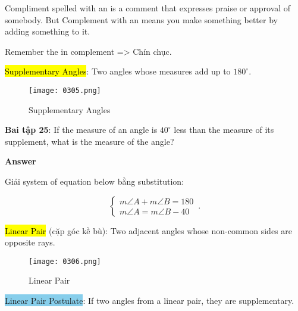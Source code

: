 Compliment spelled with an  is a comment that expresses praise or approval of somebody. But Complement with an  means you make something better by adding something to it.

Remember the  in complement => Chín chục.

\vspace{10 mm}

\hl{Supplementary Angles}: Two angles whose measures add up to $180^{\circ}$.

\begin{figure}[htb!]
  \centering
  \texttt{[image: 0305.png]}
  \caption{Supplementary Angles}
\end{figure}

\textbf{Bai tập 25}: If the measure of an angle is $40^{\circ}$ less than the measure of its supplement, what is the measure of the angle?

\vspace{0.2 cm}

\centerline{\textbf{\normalsize Answer}}

\vspace{0.2 cm}

Giải system of equation below bằng substitution:

\begin{equation*}
    \begin{cases}
      m\angle A + m\angle B = 180\\
      m\angle A = m\angle B -40
    \end{cases}\,.
\end{equation*}

\vspace{5 cm}

\hl{Linear Pair} (cặp góc kề bù): Two adjacent angles whose non-common sides are opposite rays.

\begin{figure}[htb!]
  \centering
  \texttt{[image: 0306.png]}
  \caption{Linear Pair}
\end{figure}


\begin{tcolorbox}[colback=RoyalPurple!5!white,colframe=RoyalPurple!75!black]
  \colorbox{SkyBlue}{Linear Pair Postulate}: If two angles from a linear pair, they are supplementary.
\end{tcolorbox}

